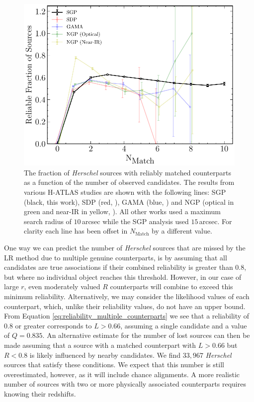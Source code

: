 \begin{figure}
    \centering
    \includegraphics[width=0.8\columnwidth]{Figures/multiplicity.pdf}
    \caption[Reliable fraction of sources as a function of the number of candidates]{The fraction of \textit{Herschel} sources with reliably matched counterparts as a function of the number of observed candidates. The results from various H-ATLAS studies are shown with the following lines: SGP (black, this work), SDP (red, \citealt{Smith_2011}), GAMA (blue, \citealt{Bourne_2016}) and NGP (optical in green and near-IR in yellow, \citealt{Furlanetto_2018}). All other works used a maximum search radius of $10\,$arcsec while the SGP analysis used $15\,$arcsec. For clarity each line has been offset in $N_{\textrm{Match}}$ by a different value.}
    \label{fig:multiplicity}
\end{figure}

One way we can predict the number of \textit{Herschel} sources that are missed by the LR method due to multiple genuine counterparts, is by assuming that all candidates are true associations if their combined reliability is greater than $0.8$, but where no individual object reaches this threshold. However, in our case of large $r$, even moderately valued $R$ counterparts will combine to exceed this minimum reliability. Alternatively, we may consider the likelihood values of each counterpart, which, unlike their reliability values, do not have an upper bound. From Equation \ref{eq:reliability_multiple_counterparts} we see that a reliability of $0.8$ or greater corresponds to $L > 0.66$, assuming a single candidate and a value of $Q = 0.835$. An alternative estimate for the number of lost sources can then be made assuming that a source with a matched counterpart with $L > 0.66$ but $R < 0.8$ is likely influenced by nearby candidates. We find $33,967$ \textit{Herschel} sources that satisfy these conditions. We expect that this number is still overestimated, however, as it will include chance alignments. A more realistic number of sources with two or more physically associated counterparts requires knowing their redshifts.

